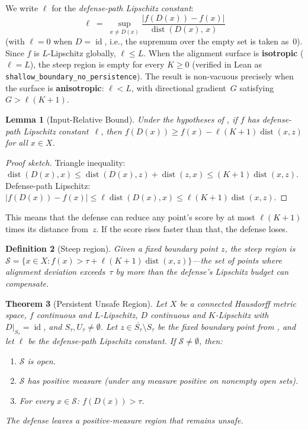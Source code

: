 \documentclass[11pt]{article}
\newtheorem{theorem}{Theorem}[section]
\newtheorem{lemma}[theorem]{Lemma}
\newtheorem{definition}[theorem]{Definition}
\newcommand{\cl}[1]{\overline{#1}}
\newcommand{\id}{\operatorname{id}}
\newcommand{\dist}{\operatorname{dist}}
\begin{document}
We write $\ell$ for the \emph{defense-path Lipschitz constant}:
\[
  \ell \;=\; \sup_{x \neq D(x)}
    \frac{|f(D(x)) - f(x)|}{\dist(D(x),\, x)}
\]
(with $\ell = 0$ when $D = \id$, i.e., the supremum over the empty
set is taken as~$0$).
Since $f$ is $L$-Lipschitz globally, $\ell \leq L$. When the
alignment surface is \textbf{isotropic} ($\ell = L$), the steep region
is empty for every $K \geq 0$ (verified in Lean as
\texttt{shallow\_boundary\_no\_persistence}). The result is
non-vacuous precisely when the surface is \textbf{anisotropic}:
$\ell < L$, with directional gradient~$G$ satisfying
$G > \ell(K+1)$.

\begin{lemma}[Input-Relative Bound]
\label{lem:input-bound}
Under the hypotheses of , if $f$ has
defense-path Lipschitz constant~$\ell$, then
$f(D(x)) \geq f(x) - \ell(K+1)\dist(x,z)$
for all $x \in X$.
\end{lemma}

\begin{proof}[Proof sketch]
Triangle inequality:
$\dist(D(x), x) \leq \dist(D(x), z) + \dist(z, x)
\leq (K+1)\dist(x, z)$.
Defense-path Lipschitz: $|f(D(x)) - f(x)| \leq \ell\dist(D(x), x)
\leq \ell(K+1)\dist(x, z)$.
\end{proof}

This means that the defense can reduce any point's score by at most
$\ell(K+1)$ times its distance from~$z$. If the score rises faster
than that, the defense loses.

\begin{definition}[Steep region]
\label{def:steep}
Given a fixed boundary point $z$, the \emph{steep region} is
$\mathcal{S} = \{x \in X : f(x) > \tau + \ell(K+1)\dist(x, z)\}$---the
set of points where alignment deviation exceeds~$\tau$ by more than
the defense's Lipschitz budget can compensate.
\end{definition}

\begin{theorem}[Persistent Unsafe Region]
\label{thm:persistent}
Let $X$ be a connected Hausdorff metric space, $f$ continuous and
$L$-Lipschitz, $D$ continuous and $K$-Lipschitz with
$D|_{S_\tau} = \id$, and $S_\tau, U_\tau \neq \emptyset$.
Let $z \in \cl{S_\tau} \setminus S_\tau$ be the fixed boundary
point from , and let $\ell$ be the defense-path
Lipschitz constant. If $\mathcal{S} \neq \emptyset$, then:
\begin{enumerate}[nosep]
  \item $\mathcal{S}$ is open.
  \item $\mathcal{S}$ has positive measure (under any measure positive
    on nonempty open sets).
  \item For every $x \in \mathcal{S}$: $f(D(x)) > \tau$.
\end{enumerate}
The defense leaves a positive-measure region that remains unsafe.
\end{theorem}
\end{document}
